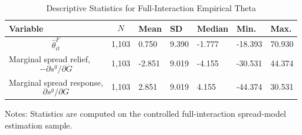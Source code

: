 \begin{table}[H]\centering
\begin{threeparttable}
\caption{Descriptive Statistics for Full-Interaction Empirical Theta}
\label{tab:theta_descriptive_stats}
\scriptsize
\begin{tabularx}{\textwidth}{lYYYYYY}
\toprule
Variable & $$N$$ & Mean & SD & Median & Min. & Max. \\
\midrule
$$\widehat{\theta}^{F}_{it}$$ & 1,103 & 0.750 & 9.390 & -1.777 & -18.393 & 70.930 \\
Marginal spread relief, $$-\partial s^g/\partial G$$ & 1,103 & -2.851 & 9.019 & -4.155 & -30.531 & 44.374 \\
Marginal spread response, $$\partial s^g/\partial G$$ & 1,103 & 2.851 & 9.019 & 4.155 & -44.374 & 30.531 \\
\bottomrule
\end{tabularx}
\begin{tablenotes}[flushleft]\footnotesize
\item Notes: Statistics are computed on the controlled full-interaction spread-model estimation sample.
\end{tablenotes}
\end{threeparttable}
\end{table}
